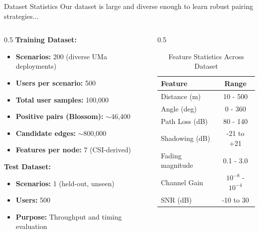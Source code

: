 \documentclass[aspectratio=169]{beamer}
\begin{document}
\begin{frame}{Dataset Statistics}
    \vspace{-0.2cm}
    \small \textcolor{iiitblue}{Our dataset is large and diverse enough to learn robust pairing strategies...}
    
    \begin{columns}
        \begin{column}{0.5\textwidth}
            \textbf{Training Dataset:}
            \begin{itemize}
                \item \textbf{Scenarios:} 200 (diverse UMa deployments)
                \item \textbf{Users per scenario:} 500
                \item \textbf{Total user samples:} 100,000
                \item \textbf{Positive pairs (Blossom):} $\sim$46,400
                \item \textbf{Candidate edges:} $\sim$800,000
                \item \textbf{Features per node:} 7 (CSI-derived)
            \end{itemize}
            
            \vspace{0.3cm}
            
            \textbf{Test Dataset:}
            \begin{itemize}
                \item \textbf{Scenarios:} 1 (held-out, unseen)
                \item \textbf{Users:} 500
                \item \textbf{Purpose:} Throughput and timing evaluation
            \end{itemize}
        \end{column}
        \begin{column}{0.5\textwidth}
            \begin{table}
                \centering
                \tiny
                \begin{tabular}{lc}
                    \toprule
                    \textbf{Feature} & \textbf{Range} \\
                    \midrule
                    Distance (m) & 10 - 500 \\
                    Angle (deg) & 0 - 360 \\
                    Path Loss (dB) & 80 - 140 \\
                    Shadowing (dB) & -21 to +21 \\
                    Fading magnitude & 0.1 - 3.0 \\
                    Channel Gain & $10^{-8}$ - $10^{-4}$ \\
                    SNR (dB) & -10 to 30 \\
                    \bottomrule
                \end{tabular}
                \caption{Feature Statistics Across Dataset}
            \end{table}
            

\end{column}
\end{columns}
\end{frame}
\end{document}
